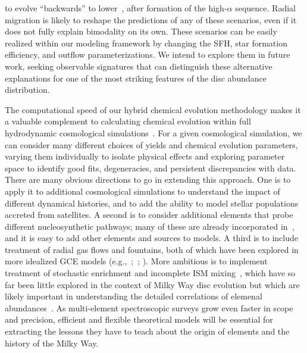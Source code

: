 to evolve ``backwards'' to lower~\feh, after formation of the high-$\alpha$ 
sequence. 
Radial migration is likely to reshape the predictions of any of these scenarios, 
even if it does not fully explain bimodality on its own. 
These scenarios can be easily realized within our modeling framework by 
changing the SFH, star formation efficiency, and outflow parameterizations. 
We intend to explore them in future work, seeking observable signatures that 
can distinguish these alternative explanations for one of the most striking 
features of the disc abundance distribution. 
\par 
The computational speed of our hybrid chemical evolution methodology makes it a 
valuable complement to calculating chemical evolution within full hydrodynamic 
cosmological simulations~\citep[e.g.][]{Mackereth2018, Grand2018, Naiman2018, 
Buck2020b, Vincenzo2020}. 
For a given cosmological simulation, we can consider many different choices of 
yields and chemical evolution parameters, varying them individually to isolate 
physical effects and exploring parameter space to identify good fits, 
degeneracies, and persistent discrepancies with data. 
There are many obvious directions to go in extending this approach. 
One is to apply it to additional cosmological simulations to understand the 
impact of different dynamical histories, and to add the ability to model 
stellar populations accreted from satellites. 
A second is to consider additional elements that probe different 
nucleosynthetic pathways; many of these are already incorporated in~\vice, and 
it is easy to add other elements and sources to models. 
A third is to include treatment of radial gas flows and fountains, both of 
which have been explored in more idealized GCE models (e.g.,~\citealp{Lacey1985, 
Bilitewski2012, Kubryk2015a, Kubryk2015b};~\citealp*{Spitoni2013}; 
\citealp{Pezzulli2016, Sharda2021a, Sharda2021b}). 
More ambitious is to implement treatment of stochastic enrichment and 
incomplete ISM mixing~\citep[e.g.][]{Montes2016, Krumholz2018b, Beniamini2020}, 
which have so far been little explored in the context of Milky Way disc 
evolution but which are likely important in understanding the detailed 
correlations of elemenal abundances~\citep{Ting2022}. 
As multi-element spectroscopic surveys grow even faster in scope and precision, 
efficient and flexible theoretical models will be essential for extracting the 
lessons they have to teach about the origin of elements and the history of the 
Milky Way. 

